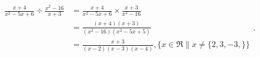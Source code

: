 \begin{question}

  \begin{equation}
    \begin{split}
      \frac{x + 4}{x^2 - 5x + 6} \div \frac{x^2 - 16}{x + 3}
            &= \frac{x + 4}{x^2 - 5x + 6} \times \frac{x + 3}{x^2 - 16} \\
            &= \frac{(x + 4)(x + 3)}{(x^2 - 16)(x^2 - 5x + 5)} \\
            &= \boxed{\frac{x + 3}{(x - 2)(x - 3)(x - 4)}, \{ x \in \Re \| x \neq \{ 2, 3, -3,  \} \}}
    \end{split}
  .\end{equation}
\end{question}
